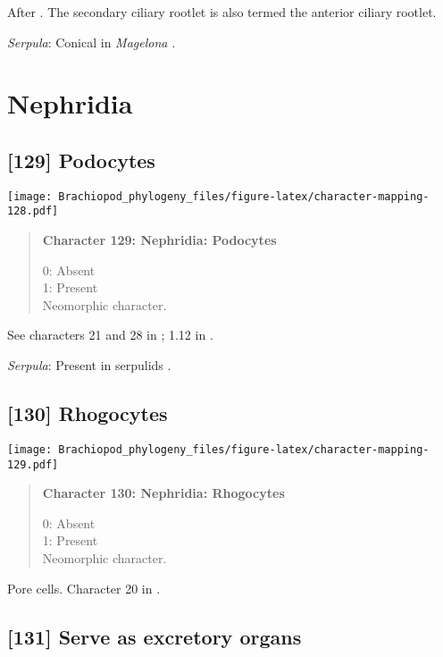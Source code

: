 \documentclass[openany]{book}
\theoremstyle{definition}
\theoremstyle{definition}
\theoremstyle{definition}
\theoremstyle{remark}
\begin{document}
After \citet{Lundin2009}. The secondary ciliary rootlet is also termed
the anterior ciliary rootlet.

\hypertarget{Serpula-coding-128}{}
\emph{Serpula}: Conical in \emph{Magelona} \citep{Bartolomaeus1995}.

\section{Nephridia}\label{nephridia}

\subsection*{{[}129{]} Podocytes}\label{podocytes}

\texttt{[image: Brachiopod\_phylogeny\_files/figure-latex/character-mapping-128.pdf]}

\begin{quote}
\textbf{Character 129: Nephridia: Podocytes}

0: Absent\\
1: Present\\
Neomorphic character.
\end{quote}

See characters 21 and 28 in \citet{Haszprunar2000}; 1.12 in
\citet{Scheltema1993}.

\hypertarget{Serpula-coding-129}{}
\emph{Serpula}: Present in serpulids \citep{Bartolomaeus2005}.

\subsection*{{[}130{]} Rhogocytes}\label{rhogocytes}

\texttt{[image: Brachiopod\_phylogeny\_files/figure-latex/character-mapping-129.pdf]}

\begin{quote}
\textbf{Character 130: Nephridia: Rhogocytes}

0: Absent\\
1: Present\\
Neomorphic character.
\end{quote}

Pore cells. Character 20 in \citet{Haszprunar2000}.

\subsection*{{[}131{]} Serve as excretory
organs}\label{serve-as-excretory-organs}
\end{document}
